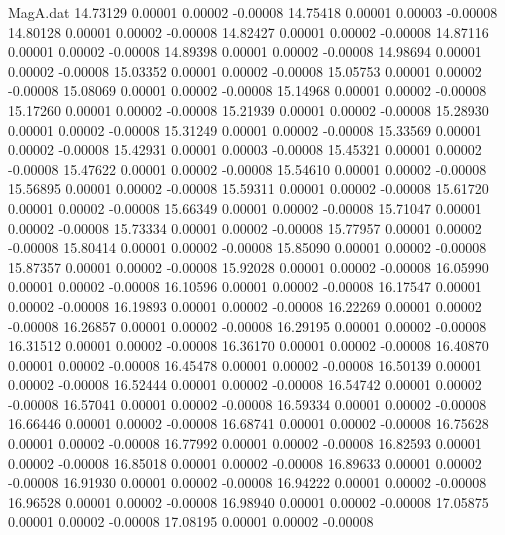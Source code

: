 \begin{filecontents}{MagA.dat}
  14.73129    0.00001    0.00002   -0.00008
  14.75418    0.00001    0.00003   -0.00008
  14.80128    0.00001    0.00002   -0.00008
  14.82427    0.00001    0.00002   -0.00008
  14.87116    0.00001    0.00002   -0.00008
  14.89398    0.00001    0.00002   -0.00008
  14.98694    0.00001    0.00002   -0.00008
  15.03352    0.00001    0.00002   -0.00008
  15.05753    0.00001    0.00002   -0.00008
  15.08069    0.00001    0.00002   -0.00008
  15.14968    0.00001    0.00002   -0.00008
  15.17260    0.00001    0.00002   -0.00008
  15.21939    0.00001    0.00002   -0.00008
  15.28930    0.00001    0.00002   -0.00008
  15.31249    0.00001    0.00002   -0.00008
  15.33569    0.00001    0.00002   -0.00008
  15.42931    0.00001    0.00003   -0.00008
  15.45321    0.00001    0.00002   -0.00008
  15.47622    0.00001    0.00002   -0.00008
  15.54610    0.00001    0.00002   -0.00008
  15.56895    0.00001    0.00002   -0.00008
  15.59311    0.00001    0.00002   -0.00008
  15.61720    0.00001    0.00002   -0.00008
  15.66349    0.00001    0.00002   -0.00008
  15.71047    0.00001    0.00002   -0.00008
  15.73334    0.00001    0.00002   -0.00008
  15.77957    0.00001    0.00002   -0.00008
  15.80414    0.00001    0.00002   -0.00008
  15.85090    0.00001    0.00002   -0.00008
  15.87357    0.00001    0.00002   -0.00008
  15.92028    0.00001    0.00002   -0.00008
  16.05990    0.00001    0.00002   -0.00008
  16.10596    0.00001    0.00002   -0.00008
  16.17547    0.00001    0.00002   -0.00008
  16.19893    0.00001    0.00002   -0.00008
  16.22269    0.00001    0.00002   -0.00008
  16.26857    0.00001    0.00002   -0.00008
  16.29195    0.00001    0.00002   -0.00008
  16.31512    0.00001    0.00002   -0.00008
  16.36170    0.00001    0.00002   -0.00008
  16.40870    0.00001    0.00002   -0.00008
  16.45478    0.00001    0.00002   -0.00008
  16.50139    0.00001    0.00002   -0.00008
  16.52444    0.00001    0.00002   -0.00008
  16.54742    0.00001    0.00002   -0.00008
  16.57041    0.00001    0.00002   -0.00008
  16.59334    0.00001    0.00002   -0.00008
  16.66446    0.00001    0.00002   -0.00008
  16.68741    0.00001    0.00002   -0.00008
  16.75628    0.00001    0.00002   -0.00008
  16.77992    0.00001    0.00002   -0.00008
  16.82593    0.00001    0.00002   -0.00008
  16.85018    0.00001    0.00002   -0.00008
  16.89633    0.00001    0.00002   -0.00008
  16.91930    0.00001    0.00002   -0.00008
  16.94222    0.00001    0.00002   -0.00008
  16.96528    0.00001    0.00002   -0.00008
  16.98940    0.00001    0.00002   -0.00008
  17.05875    0.00001    0.00002   -0.00008
  17.08195    0.00001    0.00002   -0.00008

\end{filecontents}

